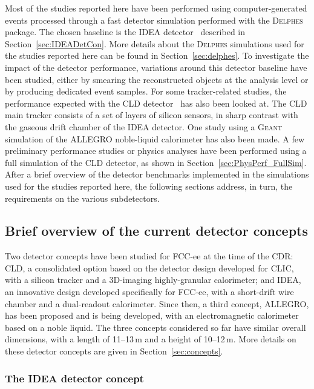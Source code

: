 Most of the studies reported here have been performed using computer-generated events processed through 
a fast detector simulation performed with the \textsc{Delphes} package. 
The chosen baseline is the IDEA detector~\cite{fcc-phys-cdr} described in Section~\ref{sec:IDEADetCon}. 
More details about the \textsc{Delphes} simulations used for the studies reported here can be found in Section~\ref{sec:delphes}.
To investigate the impact of the detector performance, variations around this detector baseline have been studied, 
either by smearing the reconstructed objects at the analysis level or by producing dedicated event samples. 
For some tracker-related studies, the performance expected with the CLD detector~\cite{Bacchetta:2019fmz} has also been looked at. 
The CLD main tracker consists of a set of layers of silicon sensors, in sharp contrast with the gaseous drift chamber of the IDEA detector. 
One study using a \textsc{Geant} simulation of the ALLEGRO noble-liquid calorimeter has also been made. 
A few preliminary performance studies or physics analyses have been performed using a full simulation of the CLD detector, 
as shown in Section~\ref{sec:PhysPerf_FullSim}.
After a brief overview of the detector benchmarks implemented in the simulations used for the studies reported here,
the following sections address, in turn, the requirements on the various subdetectors.

\subsection{Brief overview of the current detector concepts}
\label{sec:PhysPerf_DetectorConcepts}

Two detector concepts have been studied for FCC-ee at the time of the CDR: 
CLD, a consolidated option based on the detector design developed for CLIC, 
with a silicon tracker and a 3D-imaging highly-granular calorimeter; 
and IDEA, an innovative design developed specifically for FCC-ee, 
with a short-drift wire chamber and a dual-readout calorimeter. 
Since then, a third concept, ALLEGRO, has been proposed and is being developed, 
with an electromagnetic calorimeter based on a noble liquid. 
The three concepts considered so far have similar overall dimensions, 
with a length of 11--13\,m and a height of 10--12\,m. 
More details on these detector concepts are given in Section~\ref{sec:concepts}.

\subsubsection{The IDEA detector concept}

